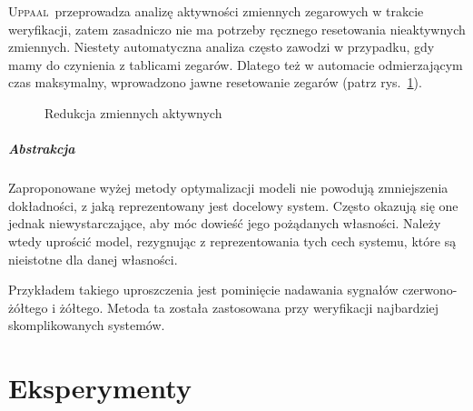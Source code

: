 \documentclass{pracamgr}
\newcommand{\imgr}[1]{rys.~\ref{#1}}
\newcommand{\upp}{\textsc{Uppaal}}
\theoremstyle{plain}
\begin{document}
\upp\ przeprowadza analizę aktywności zmiennych zegarowych w trakcie
weryfikacji, zatem zasadniczo nie ma potrzeby ręcznego resetowania
nieaktywnych zmiennych. Niestety automatyczna analiza często zawodzi w
przypadku, gdy mamy do czynienia z tablicami zegarów. Dlatego też w
automacie odmierzającym czas maksymalny, wprowadzono jawne resetowanie
zegarów (patrz \imgr{img:models-active-reduction}).

\begin{figure}
  \centering
  \hfill
  \caption{Redukcja zmiennych aktywnych}
  \label{img:models-active-reduction}
\end{figure}

\paragraph{Abstrakcja} Zaproponowane wyżej metody optymalizacji modeli
nie powodują zmniejszenia dokładności, z jaką reprezentowany jest
docelowy system. Często okazują się one jednak niewystarczające, aby
móc dowieść jego pożądanych własności. Należy wtedy uprościć model,
rezygnując z reprezentowania tych cech systemu, które są nieistotne
dla danej własności.

Przykładem takiego uproszczenia jest pominięcie nadawania sygnałów
czerwono-żółtego i żółtego. Metoda ta została zastosowana przy
weryfikacji najbardziej skomplikowanych systemów.

\chapter{Eksperymenty}
\end{document}
